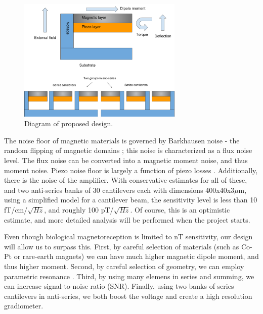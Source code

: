 \begin{figure}[H]
\centering
\includegraphics[width=0.7\textwidth]{biomag}
\caption{Diagram of proposed design.}
\label{fig:diagram}
\end{figure}

The noise floor of magnetic materials is governed by Barkhausen noise - the random flipping of magnetic domains \cite{butta2012sources}; this noise is characterized as a flux noise level. The flux noise can be converted into a magnetic moment noise, and thus moment noise. Piezo noise floor is largely a function of piezo losses \cite{levinzon2004fundamental}. Additionally, there is the noise of the amplifier. With conservative estimates for all of these, and two anti-series banks of 30 cantilevers each with dimensions 400x40x3$\mu$m, using a simplified model for a cantilever beam, the sensitivity level is less than 10 fT/cm/$\sqrt{Hz}$, and roughly 100 pT/$\sqrt{Hz}$. Of course, this is an optimistic estimate, and more detailed analysis will be performed when the project starts. 

 Even though biological magnetoreception is limited to nT sensitivity, our design will allow us to surpass this. First, by careful selection of materials (such as Co-Pt or rare-earth magnets) \cite{coey2010magnetism, arnold2009permanent} we can have much higher magnetic dipole moment, and thus higher moment. Second, by careful selection of geometry, we can employ parametric resonance \cite{van2006resonant}. Third, by using many elemens in series and summing, we can increase signal-to-noise ratio (SNR). Finally, using two banks of series cantilevers in anti-series, we both boost the voltage and create a high resolution gradiometer.

